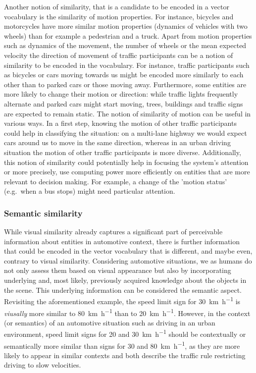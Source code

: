 Another notion of similarity, that is a candidate to be encoded in a vector vocabulary is the similarity of motion properties.
For instance, bicycles and motorcycles have more similar motion properties (dynamics of vehicles with two wheels) than for example a pedestrian and a truck.
Apart from motion properties such as dynamics of the movement, the number of wheels or the mean expected velocity the direction of movement of traffic participants can be a notion of similarity to be encoded in the vocabulary.
For instance, traffic participants such as bicycles or cars moving towards us might be encoded more similarly to each other than to parked cars or those moving away.
Furthermore, some entities are more likely to change their motion or direction: while traffic lights frequently alternate and parked cars might start moving, trees, buildings and traffic signs are expected to remain static. 
The notion of similarity of motion can be useful in various ways.
In a first step, knowing the motion of other traffic participants could help in classifying the situation: on a multi-lane highway we would expect cars around us to move in the same direction, whereas in an urban driving situation the motion of other traffic participants is more diverse. 
Additionally, this notion of similarity could potentially help in focusing the system's attention or more precisely, use computing power more efficiently on entities that are more relevant to decision making.
For example, a change of the 'motion status' (e.g.\ when a bus stops) might need particular attention.

\subsubsection{Semantic similarity}%
\label{ssubsec:semantic_similarity}

While visual similarity already captures a significant part of perceivable information about entities in automotive context, there is further information that could be encoded in the vector vocabulary that is different, and maybe even, contrary to visual similarity. 
Considering automotive situations, we as humans do not only assess them based on visual appearance but also by incorporating underlying and, most likely, previously acquired knowledge about the objects in the scene.
This underlying information can be considered the semantic aspect.
Revisiting the aforementioned example, the speed limit sign for \SI[per-mode=symbol]{30}{\kilo\meter\per\hour} is \emph{viusally} more similar to \SI[per-mode=symbol]{80}{\kilo\meter\per\hour} than to \SI[per-mode=symbol]{20}{\kilo\meter\per\hour}.
However, in the context (or semantics) of an automotive situation such as driving in an urban environment, speed limit signs for \num{20} and \SI[per-mode=symbol]{30}{\kilo\meter\per\hour} should be contextually or semantically more similar than signs for \num{30} and \SI[per-mode=symbol]{80}{\kilo\meter\per\hour}, as they are more likely to appear in similar contexts and both describe the traffic rule restricting driving to slow velocities.

